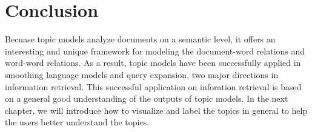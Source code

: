 \section{Conclusion}

Becuase topic models analyze documents on a semantic level, it offers
an interesting and unique framework for modeling the document-word
relations and word-word relations. As a result, topic models have been
successfully applied in smoothing language models and query expansion,
two major directions in information retrieval. This successful
application on inforation retrieval is based on a general good
understanding of the outputs of topic models. In the next chapter, we
will introduce how to visualize and label the topics in general to
help the users better understand the topics.







